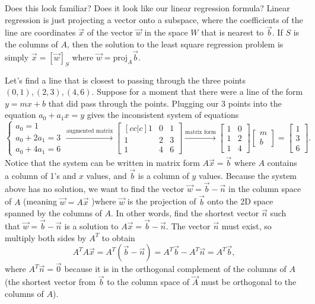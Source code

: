 Does this look familiar? Does it look like our linear regression formula? Linear regression is just projecting a vector onto a subspace, where the coefficients of the line are coordinates $\vec x$ of the vector $\vec w$ in the space $W$ that is nearest to $\vec b$. If $S$ is the columns of $A$, then the solution to the least square regression problem is simply $\vec x = [\vec w]_S$ where $\vec w = \text{proj}_A\vec b$.


\begin{example}
Let's find a line that is closest to passing through the three points $(0,1),(2,3),(4,6)$. Suppose for a moment that there were a line of the form $y=mx+b$ that did pass through the points.  Plugging our 3 points into the equation $a_0+a_1x=y$ gives the inconsistent system of equations 
$$\begin{cases}a_0=1\\a_0+2a_1=3\\a_0+4a_1=6\end{cases}
\xrightarrow{\text{augmented matrix}}
\begin{bmatrix}[cc|c]1&0&1\\1&2&3\\1&4&6\end{bmatrix}
\xrightarrow{\text{matrix form}}
\begin{bmatrix}1&0\\1&2\\1&4\end{bmatrix}
\begin{bmatrix}m\\b\end{bmatrix}
=\begin{bmatrix}1\\3\\6\end{bmatrix}.
$$
Notice that the system can be written in matrix form $A\vec x = \vec b$ where $A$ contains a column of 1's and $x$ values, and $\vec b$ is a column of $y$ values.  Because the system above has no solution, we want to find the vector $\vec w = \vec b-\vec n$ in the column space of $A$ (meaning $\vec w=A\vec x$ )where $\vec w$ is the projection of $\vec b$ onto the 2D space spanned by the columns of $A$. In other words, find the shortest vector $\vec n$ such that $\vec w= \vec b-\vec n$ is a solution to $A\vec x = \vec b-\vec n$. The vector $\vec n$ must exist, so multiply both sides by $A^T$ to obtain
$$A^T A \vec x = A^T(\vec b-\vec n) =A^T\vec b - A^T\vec n = A^T\vec b,$$
where $A^T\vec n = \vec 0$ because it is in the orthogonal complement of the columns of $A$ (the shortest vector from $\vec b$ to the column space of $\vec A$ must be orthogonal to the columns of $A$). 

\end{example}
